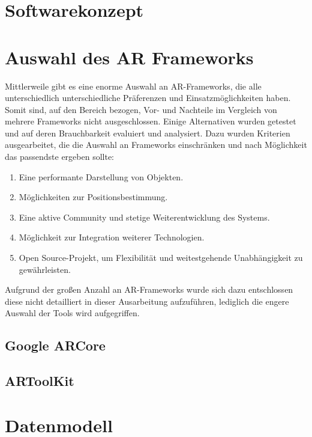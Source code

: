 \section{Softwarekonzept}
\label{chap:Softwarekonzept}

\section{Auswahl des AR Frameworks}
\label{chap:Auswahl des AR Frameworks}
Mittlerweile gibt es eine enorme Auswahl an \acs{AR}-Frameworks, die alle unterschiedlich unterschiedliche Präferenzen und 
Einsatzmöglichkeiten haben. Somit sind, auf den Bereich bezogen, Vor- und Nachteile im Vergleich von mehrere Frameworks nicht ausgeschlossen. 
Einige Alternativen wurden getestet und auf deren Brauchbarkeit evaluiert und analysiert. Dazu wurden Kriterien ausgearbeitet, die die 
Auswahl an Frameworks einschränken und nach Möglichkeit das passendste ergeben sollte: 
\begin{enumerate}
    \item Eine performante Darstellung von Objekten.
    \item Möglichkeiten zur Positionsbestimmung.
    \item Eine aktive Community und stetige Weiterentwicklung des Systems.
    \item Möglichkeit zur Integration weiterer Technologien.
    \item Open Source-Projekt, um Flexibilität und weitestgehende Unabhängigkeit zu gewährleisten.
\end{enumerate}
Aufgrund der großen Anzahl an \acs{AR}-Frameworks wurde sich dazu entschlossen diese nicht detailliert in dieser Ausarbeitung aufzuführen, 
lediglich die engere Auswahl der Tools wird aufgegriffen. 
\subsection{Google ARCore}
\subsection{ARToolKit}

\section{Datenmodell}
\label{chap:Datenmodell}